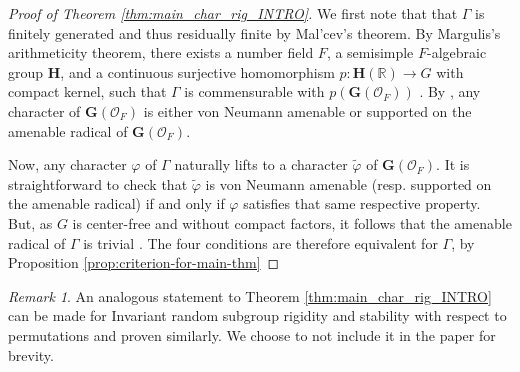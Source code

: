 \documentclass[11pt]{amsart}
\newcommand{\R}{{\mathbb{R}}}
\newcommand{\bG}{{\mathbf{G}}}
\newcommand{\bH}{{\mathbf{H}}}
\newtheorem{corollary}[theorem]{Corollary}
\theoremstyle{definition}
\theoremstyle{remark}
\newtheorem{remark}[theorem]{Remark}
\theoremstyle{definition}
\begin{document}
\begin{proof}[Proof of Theorem \ref{thm:main_char_rig_INTRO}]
We first note that  that $\Gamma$ is finitely generated \cite[Remark 6.18]{raghunathan1972discrete} and thus residually finite by Mal'cev's theorem.
 By  Margulis's arithmeticity theorem, there exists a number field $F$, a semisimple $F$-algebraic group $\bH$, and a continuous surjective homomorphism $p:\bH(\R)\to G$ with compact kernel,  such that $\Gamma$ is commensurable with $p(\bG(\mathcal{O}_F))$ \cite[Chapter XI, Theorem (6.5)]{margulis1991discrete}. By \cite[Theorem B]{BBH},  any character of $\bG(\mathcal{O}_F)$ is either von Neumann amenable or supported on the amenable radical of $\bG(\mathcal{O}_F)$.   

Now, any character $\varphi$ of $\Gamma$ naturally lifts to a character $\tilde{\varphi}$ of $\bG(\mathcal{O}_F)$. It is straightforward to check that  $\tilde{\varphi}$ is von Neumann amenable (resp. supported on the amenable radical) if and only if $\varphi$ satisfies that same respective property. But, as $G$ is center-free and without compact factors, it follows that the amenable radical of $\Gamma$ is trivial  \cite[Lemma 4.8]{BV}. The four conditions are therefore equivalent  for $\Gamma$, by Proposition \ref{prop:criterion-for-main-thm}
\end{proof}

\begin{remark}
    An analogous statement to Theorem \ref{thm:main_char_rig_INTRO} can be made for Invariant random subgroup rigidity and stability with respect to permutations and proven similarly. 
    We choose to not include it in the paper for brevity. 
\end{remark}

\end{document}

